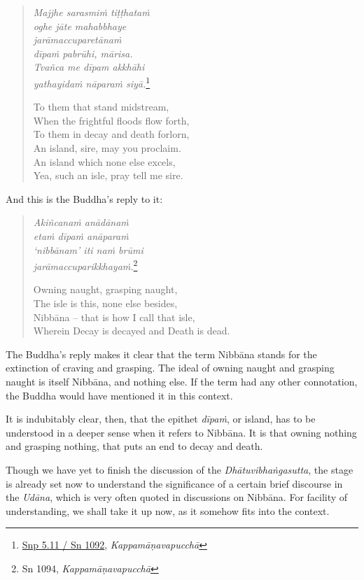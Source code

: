 \begin{quote}
\emph{Majjhe sarasmiṁ tiṭṭhataṁ}\\
\emph{oghe jāte mahabbhaye}\\
\emph{jarāmaccuparetānaṁ}\\
\emph{dīpaṁ pabrūhi, mārisa.}\\
\emph{Tvañca me dīpam akkhāhi}\\
\emph{yathayidaṁ nāparaṁ siyā.}\footnote{\href{https://suttacentral.net/snp5.11/pli/ms}{Snp 5.11 / Sn 1092}, \emph{Kappamāṇavapucchā}}

To them that stand midstream,\\
When the frightful floods flow forth,\\
To them in decay and death forlorn,\\
An island, sire, may you proclaim.\\
An island which none else excels,\\
Yea, such an isle, pray tell me sire.
\end{quote}

\clearpage

And this is the Buddha's reply to it:

\begin{quote}
\emph{Akiñcanaṁ anādānaṁ}\\
\emph{etaṁ dīpaṁ anāparaṁ}\\
\emph{`nibbānam' iti naṁ brūmi}\\
\emph{jarāmaccuparikkhayaṁ.}\footnote{Sn 1094, \emph{Kappamāṇavapucchā}}

Owning naught, grasping naught,\\
The isle is this, none else besides,\\
Nibbāna -- that is how I call that isle,\\
Wherein Decay is decayed and Death is dead.
\end{quote}

The Buddha's reply makes it clear that the term Nibbāna stands for the extinction of craving and grasping. The ideal of owning naught and grasping naught is itself Nibbāna, and nothing else. If the term had any other connotation, the Buddha would have mentioned it in this context.

It is indubitably clear, then, that the epithet \emph{dīpaṁ}, or island, has to be understood in a deeper sense when it refers to Nibbāna. It is that owning nothing and grasping nothing, that puts an end to decay and death.

Though we have yet to finish the discussion of the \emph{Dhātuvibhaṅgasutta}, the stage is already set now to understand the significance of a certain brief discourse in the \emph{Udāna}, which is very often quoted in discussions on Nibbāna. For facility of understanding, we shall take it up now, as it somehow fits into the context.

